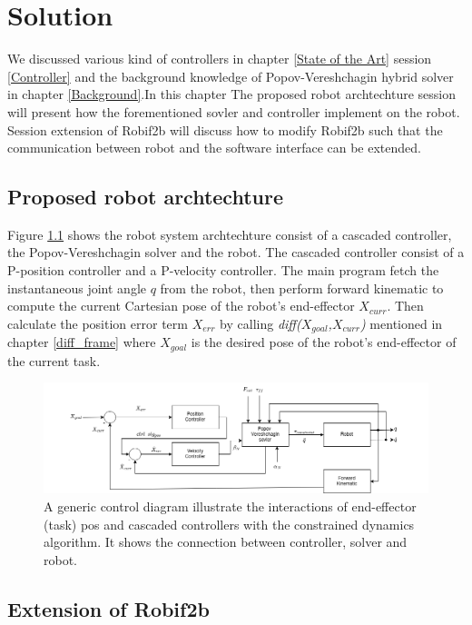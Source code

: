 \documentclass[report.tex]{subfiles}
\begin{document}
    \chapter{Solution}
    We discussed various kind of controllers in chapter \ref{State of the Art} session \ref{Controller} and the background knowledge of Popov-Vereshchagin hybrid solver in chapter \ref{Background}.In this chapter The proposed robot archtechture session will present how the forementioned sovler and controller implement on the robot. Session extension of Robif2b will discuss how to modify Robif2b such that the communication between robot and the software interface can be extended.

    \section{Proposed robot archtechture}

    Figure \ref{fig:sys} shows the robot system archtechture consist of a cascaded controller, the Popov-Vereshchagin solver and the robot. The cascaded controller consist of a P-position controller and a P-velocity controller. The main program fetch the instantaneous joint angle $q$ from the robot, then perform forward kinematic to compute the current Cartesian pose of the robot's end-effector $X_{curr}$. Then calculate the position error term $X_{err}$ by calling \textit{diff($X_{goal}$,$X_{curr}$)} mentioned in chapter \ref{diff_frame} where $X_{goal}$ is the desired pose of the robot's end-effector of the current task.
    \begin{figure}[h!]
        \centering
        \includegraphics[width=1\linewidth]{images/systemdia.png}
        \caption{A generic control diagram illustrate the interactions of end-effector (task)
        pos and cascaded controllers with the constrained dynamics
        algorithm. It shows the connection between controller, solver and robot.}
        \label{fig:sys}
    \end{figure}
    \section{Extension of Robif2b}
\end{document}

